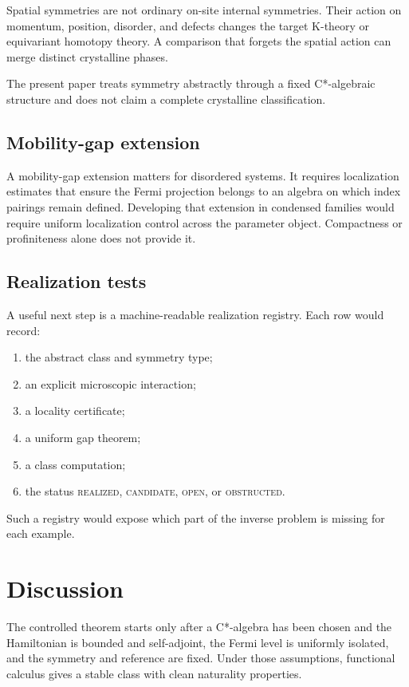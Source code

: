 \documentclass[12pt]{article}
\theoremstyle{definition}
\theoremstyle{remark}
\newcommand{\status}[1]{\textsc{#1}}
\begin{document}
Spatial symmetries are not ordinary on-site internal symmetries.
Their action on momentum, position, disorder, and defects changes the target
K-theory or equivariant homotopy theory.
A comparison that forgets the spatial action can merge distinct crystalline
phases.

The present paper treats symmetry abstractly through a fixed C*-algebraic
structure and does not claim a complete crystalline classification.

\subsection{Mobility-gap extension}

A mobility-gap extension matters for disordered systems.
It requires localization estimates that ensure the Fermi projection belongs
to an algebra on which index pairings remain defined.
Developing that extension in condensed families would require uniform
localization control across the parameter object.
Compactness or profiniteness alone does not provide it.

\subsection{Realization tests}

A useful next step is a machine-readable realization registry.
Each row would record:

\begin{enumerate}[label=(\roman*)]
  \item the abstract class and symmetry type;
  \item an explicit microscopic interaction;
  \item a locality certificate;
  \item a uniform gap theorem;
  \item a class computation;
  \item the status \status{realized}, \status{candidate}, \status{open}, or
  \status{obstructed}.
\end{enumerate}

Such a registry would expose which part of the inverse problem is missing for
each example.

\section{Discussion}

The controlled theorem starts only after a C*-algebra has been chosen and the
Hamiltonian is bounded and
self-adjoint, the Fermi level is uniformly isolated, and the symmetry and
reference are fixed.
Under those assumptions, functional calculus gives a stable class with clean
naturality properties.
\end{document}
